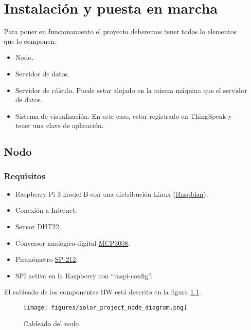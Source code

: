 \cleardoublepage

\chapter{Instalación y puesta en marcha}
\label{makereference8}

Para poner en funcionamiento el proyecto deberemos tener todos lo elementos que lo componen:
\begin{itemize}
\item Nodo.
\item Servidor de datos.
\item Servidor de cálculo. Puede estar alojado en la misma máquina que el servidor de datos.
\item Sistema de visualización. En este caso, estar registrado en ThingSpeak y tener una clave de aplicación.
\end{itemize}

\section{Nodo}
\label{makereference8.1}
\subsection{Requisitos}
\label{makereference8.1.2}
	\begin{itemize}
		\item Raspberry Pi 3 model B con una distribución Linux (\href{https://www.raspberrypi.org/downloads/raspbian/}{Raspbian}).
		\item Conexión a Internet.
		\item \href{https://www.adafruit.com/product/385}{Sensor DHT22}.
		\item Conversor analógico-digital \href{https://www.adafruit.com/product/856}{MCP3008}.
		\item Piranómetro \href{https://www.apogeeinstruments.co.uk/content/SP-212-215-manual.pdf}{SP-212}.
		\item SPI activo en la Raspberry con ``raspi-config''.
	\end{itemize}

El cableado de los componentes HW está descrito en la figura \ref{wiring}.
\begin{figure}[htb]
	\begin{center}
		\texttt{[image: figures/solar\_project\_node\_diagram.png]}
		\caption{Cableado del nodo \label{wiring}}
	\end{center}
\end{figure}

